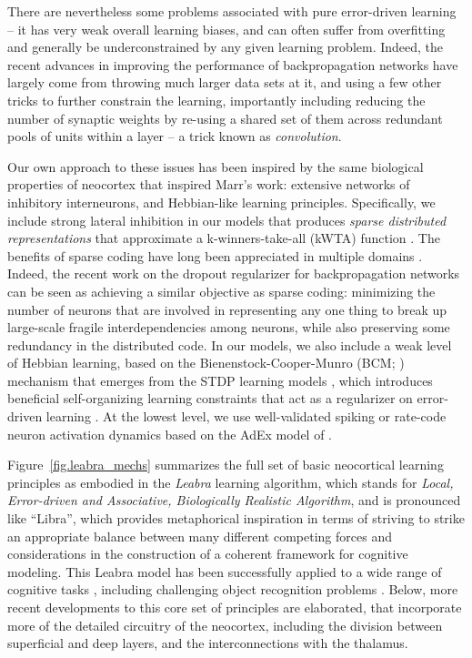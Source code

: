 \documentclass[11pt,twoside]{article}
\newif\myifpdf
\begin{document}
There are nevertheless some problems associated with pure error-driven learning -- it has very weak overall learning biases, and can often suffer from overfitting and generally be underconstrained by any given learning problem.  Indeed, the recent advances in improving the performance of backpropagation networks have largely come from throwing much larger data sets at it, and using a few other tricks to further constrain the learning, importantly including reducing the number of synaptic weights by re-using a shared set of them across redundant pools of units within a layer -- a trick known as {\em convolution}.  

Our own approach to these issues has been inspired by the same biological properties of neocortex that inspired Marr's work: extensive networks of inhibitory interneurons, and Hebbian-like learning principles.  Specifically, we include strong lateral inhibition in our models that produces {\em sparse distributed representations} that approximate a k-winners-take-all (kWTA) function \cite{OReilly98}.  The benefits of sparse coding have long been appreciated in multiple domains \cite[e.g.,]{Kanerva88,Foldiak90,OlshausenField96,OlshausenField97}.  Indeed, the recent work on the dropout regularizer for backpropagation networks \cite{SrivastavaHintonKrizhevskyEtAl14} can be seen as achieving a similar objective as sparse coding: minimizing the number of neurons that are involved in representing any one thing to break up large-scale fragile interdependencies among neurons, while also preserving some redundancy in the distributed code.  In our models, we also include a weak level of Hebbian learning, based on the Bienenstock-Cooper-Munro (BCM; \cite{BienenstockCooperMunro82}) mechanism that emerges from the STDP learning models \cite{BlairIntratorShouvalEtAl98,ShouvalWangWittenberg10}, which introduces beneficial self-organizing learning constraints that act as a regularizer on error-driven learning \cite{OReilly98,OReilly01,OReillyMunakata00,OReillyMunakataFrankEtAl12}.  At the lowest level, we use well-validated spiking or rate-code neuron activation dynamics based on the AdEx model of .

Figure~\ref{fig.leabra_mechs} summarizes the full set of basic neocortical learning principles as embodied in the {\em Leabra} learning algorithm, which stands for {\em Local, Error-driven and Associative, Biologically Realistic Algorithm}, and is pronounced like ``Libra'', which provides metaphorical inspiration in terms of striving to strike an
appropriate balance between many different competing forces and considerations
in the construction of a coherent framework for cognitive modeling.  This Leabra model has been successfully applied to a wide range of cognitive tasks \cite{OReillyMunakata00,OReillyMunakataFrankEtAl12}, including challenging object recognition problems \cite{OReillyWyatteHerdEtAl13}.  Below, more recent developments to this core set of principles are elaborated, that incorporate more of the detailed circuitry of the neocortex, including the division between superficial and deep layers, and the interconnections with the thalamus.
\end{document}
